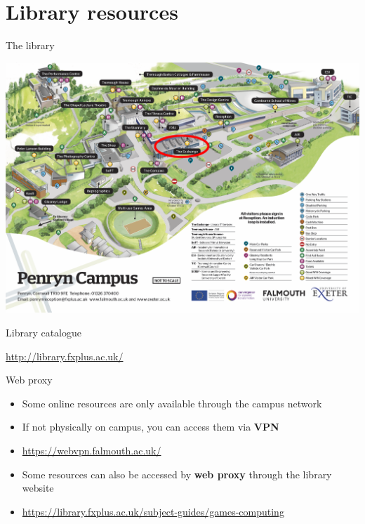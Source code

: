 \part{Library resources}
\frame{\partpage}

\begin{frame}{The library}
	\begin{center}
		\includegraphics[height=0.7\textheight]{campus_map}
	\end{center}
\end{frame}

\begin{frame}{Library catalogue}
	\begin{center}
		\url{http://library.fxplus.ac.uk/}
	\end{center}
\end{frame}

\begin{frame}{Web proxy}
    \begin{itemize}
        \pause\item Some online resources are only available through the campus network
        \pause\item If not physically on campus, you can access them via \textbf{VPN}
        \pause\item \url{https://webvpn.falmouth.ac.uk/}
        \pause\item Some resources can also be accessed by \textbf{web proxy} through the library website
        \pause\item \url{https://library.fxplus.ac.uk/subject-guides/games-computing}
	\end{itemize}
\end{frame}

